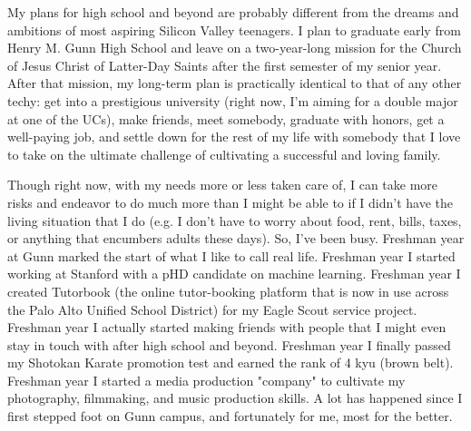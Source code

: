 

\begin{cvparagraph}

My plans for high school and beyond are probably different from the dreams and
	ambitions of most aspiring Silicon Valley teenagers. I plan to graduate
	early from Henry M. Gunn High School and leave on a two-year-long
	mission for the Church of Jesus Christ of Latter-Day Saints after the
	first semester of my senior year. After that mission, my long-term plan
	is practically identical to that of any other techy: get into a
	prestigious university (right now, I'm aiming for a double major at one
	of the UCs), make friends, meet somebody, graduate with honors, get a
	well-paying job, and settle down for the rest of my life with somebody
	that I love to take on the ultimate challenge of cultivating a
	successful and loving family.
\end{cvparagraph}
\begin{cvparagraph}
Though right now, with my needs more or less taken care of, I can take more
	risks and endeavor to do much more than I might be able to if I didn't
	have the living situation that I do (e.g. I don't have to worry about
	food, rent, bills, taxes, or anything that encumbers adults these days).
	So, I've been busy. Freshman year at Gunn marked the start of what I
	like to call real life. Freshman year I started working at Stanford with
	a pHD candidate on machine learning. Freshman year I created Tutorbook
	(the online tutor-booking platform that is now in use across the Palo
	Alto Unified School District) for my Eagle Scout service project.
	Freshman year I actually started making friends with people that I might
	even stay in touch with after high school and beyond. Freshman year I
	finally passed my Shotokan Karate promotion test and earned the rank of
	4 kyu (brown belt). Freshman year I started a media production "company"
	to cultivate my photography, filmmaking, and music production skills. A
	lot has happened since I first stepped foot on Gunn campus, and
	fortunately for me, most for the better.
\end{cvparagraph}
